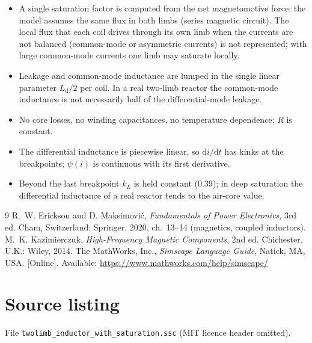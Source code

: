 \documentclass[11pt,a4paper]{article}
\begin{document}
\begin{itemize}
  \item A single saturation factor is computed from the net magnetomotive force: the
        model assumes the same flux in both limbs (series magnetic circuit). The local
        flux that each coil drives through its own limb when the currents are not
        balanced (common-mode or asymmetric currents) is not represented; with large
        common-mode currents one limb may saturate locally.
  \item Leakage and common-mode inductance are lumped in the single linear parameter
        $L_\mathrm{d}/2$ per coil. In a real two-limb reactor the common-mode inductance
        is not necessarily half of the differential-mode leakage.
  \item No core losses, no winding capacitances, no temperature dependence; $R$ is
        constant.
  \item The differential inductance is piecewise linear, so
        $\mathrm{d}i/\mathrm{d}t$ has kinks at the breakpoints; $\psi(i)$ is continuous
        with its first derivative.
  \item Beyond the last breakpoint $k_L$ is held constant ($0.39$); in deep saturation
        the differential inductance of a real reactor tends to the air-core value.
\end{itemize}

\begin{thebibliography}{9}
 R.~W. Erickson and D. Maksimovi\'c, \emph{Fundamentals of Power
  Electronics}, 3rd ed. Cham, Switzerland: Springer, 2020, ch.~13--14 (magnetics,
  coupled inductors).
 M.~K. Kazimierczuk, \emph{High-Frequency Magnetic Components},
  2nd ed. Chichester, U.K.: Wiley, 2014.
 The MathWorks, Inc., \emph{Simscape Language Guide}, Natick, MA,
  USA. [Online]. Available: \url{https://www.mathworks.com/help/simscape/}
\end{thebibliography}

\appendix
\section{Source listing}
\label{app:src}

File \texttt{twolimb\_inductor\_with\_saturation.ssc} (MIT licence header omitted).
\end{document}
